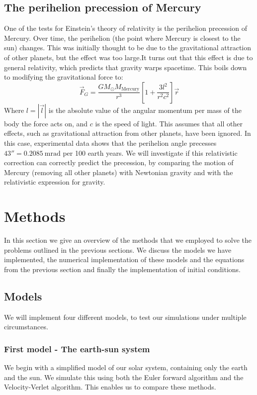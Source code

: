 \documentclass[a4paper, 10pt]{article}
\begin{document}
\subsection{The perihelion precession of Mercury}\label{GR_section}
One of the tests for Einstein's theory of relativity is the perihelion precession of Mercury.  Over time, the perihelion (the point where Mercury is closest to the sun) changes. This was initially thought to be due to the gravitational attraction of other planets, but the effect was too large.It turns out that this effect is due to general relativity, which predicts that gravity warps spacetime. This boils down to modifying the gravitational force to:
\begin{equation}\label{eq:GR_equation}
\vec{F}_G=\frac{GM_{\odot}M_{\mathrm{Mercury}}}{r^3}\left[1+\frac{3l^2}{r^2c^2}\right]\vec{r}
\end{equation}
Where $l=|\vec{l}|$ is the absolute value of the angular momentum per mass of the body the force acts on, and $c$ is the speed of light. This assumes that all other effects, such as gravitational attraction from other planets, have been ignored. In this case, experimental data shows that the perihelion angle precesses $43''=0.2085\  \mathrm{mrad}$ per 100 earth years. We will investigate if this relativistic correction can correctly predict the precession, by comparing the motion of Mercury (removing all other planets) with Newtonian gravity and with the relativistic expression for gravity.
\newpage
\section{Methods}
In this section we give an overview of the methods that we employed to solve the problems outlined in the previous sections. We discuss the models we have implemented, the numerical implementation of these models and the equations from the previous section and finally the implementation of initial conditions.
\subsection{Models}\label{models}
We will implement four different models, to test our simulations under multiple circumstances. 
\subsubsection{First model - The earth-sun system}\label{First_model}
We begin with a simplified model of our solar system, containing only the earth and the sun. We simulate this using both the Euler forward algorithm and the Velocity-Verlet algorithm. This enables us to compare these methods. 
\end{document}
